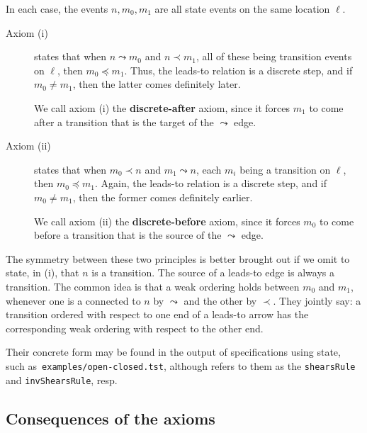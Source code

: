 In each case, the events $n,m_0,m_1$ are all state events on the same
location $\ell$.
%
\begin{description}
  \item[Axiom (i)] states that when $n\leadsto m_0$ and $n\prec m_1$,
  all of these being transition events on $\ell$, then
  $m_0\preceq m_1$.  Thus, the leads-to relation is a discrete step,
  and if $m_0\not= m_1$, then the latter comes definitely later.

  We call axiom (i) the \textbf{discrete-after} axiom, since it forces
  $m_1$ to come after a transition that is the target of the
  $\leadsto$ edge.
  \item[Axiom (ii)] states that when $m_0\prec n$ and $m_1\leadsto n$,
  each $m_i$ being a transition on $\ell$, then $m_0\preceq m_1$.
  Again, the leads-to relation is a discrete step, and if
  $m_0\not= m_1$, then the former comes definitely earlier.

  We call axiom (ii) the \textbf{discrete-before} axiom, since it
  forces $m_0$ to come before a transition that is the source of the
  $\leadsto$ edge.
\end{description}
%
The symmetry between these two principles is better brought out if we
omit to state, in (i), that $n$ is a transition.  The source of a
leads-to edge is always a transition.  The common idea is that a weak
ordering holds between $m_0$ and $m_1$, whenever one is a connected to
$n$ by $\leadsto$ and the other by $\prec$.  They jointly say:  a
transition ordered with respect to one end of a leads-to arrow has the
corresponding weak ordering with respect to the other end.

Their concrete form may be found in the output of {\cpsa}
specifications using state, such as~\texttt{examples/open-closed.tst},
although {\cpsa} refers to them as the \texttt{shearsRule} and
\texttt{invShearsRule}, resp.

\subsection{Consequences of the axioms}
\label{sec:channels:state:consequences}

